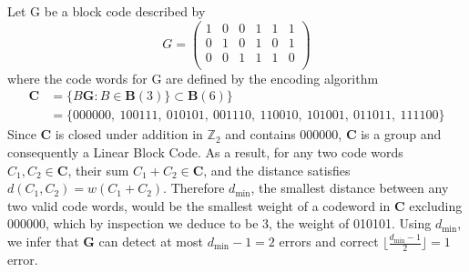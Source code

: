 \documentclass{article}
\begin{document}
Let G be a block code described by
\[
G = \begin{pmatrix}
    1 & 0 & 0 & 1 & 1 & 1 \\
    0 & 1 & 0 & 1 & 0 & 1 \\
    0 & 0 & 1 & 1 & 1 & 0 \\
\end{pmatrix}
\]
where the code words for G are defined by the encoding algorithm 
\begin{align*}
\mathbf{C} &= \{B\mathbf{G} : B \in \mathbf{B}(3)\} \subset \mathbf{B}(6)\} \\
           &= \{000000,\ 100111,\ 010101,\ 001110,\ 110010,\ 101001,\ 011011,\ 111100\}
\end{align*}
Since \(\mathbf{C}\) is closed under addition in \(\mathbb{Z}_2\) and contains 000000, \(\mathbf{C}\) 
is a group and consequently a Linear Block Code. As a result, for any two code words \(C_1, C_2 \in \mathbf{C}\),
their sum \(C_1 + C_2 \in \mathbf{C}\), and the distance satisfies \(d(C_1, C_2) = w(C_1 + C_2)\).
Therefore \(d_\text{min}\), the smallest distance between any two valid code words, would be the 
smallest weight of a codeword in \(\mathbf{C}\) excluding 000000, which by inspection we deduce to be 3, 
the weight of 010101. Using \(d_\text{min}\), we infer that \(\mathbf{G}\) can detect at most 
\(d_\text{min} - 1 = 2\) errors and correct \(\lfloor\frac{d_\text{min} - 1}{2}\rfloor = 1\)
error.
\end{document}
